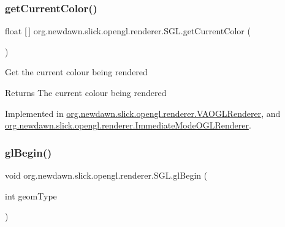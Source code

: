 \mbox{\label{interfaceorg_1_1newdawn_1_1slick_1_1opengl_1_1renderer_1_1_s_g_l_a212dd49f0deb91e38d917b5702704863}} 
\subsubsection{\texorpdfstring{get\+Current\+Color()}{getCurrentColor()}}
{\footnotesize\ttfamily float \mbox{[}$\,$\mbox{]} org.\+newdawn.\+slick.\+opengl.\+renderer.\+S\+G\+L.\+get\+Current\+Color (\begin{DoxyParamCaption}{ }\end{DoxyParamCaption})}

Get the current colour being rendered

\begin{DoxyReturn}{Returns}
The current colour being rendered 
\end{DoxyReturn}


Implemented in \mbox{\hyperlink{classorg_1_1newdawn_1_1slick_1_1opengl_1_1renderer_1_1_v_a_o_g_l_renderer_ab36435be5d5f256e10210a6a6b322727}{org.\+newdawn.\+slick.\+opengl.\+renderer.\+V\+A\+O\+G\+L\+Renderer}}, and \mbox{\hyperlink{classorg_1_1newdawn_1_1slick_1_1opengl_1_1renderer_1_1_immediate_mode_o_g_l_renderer_ad17f021212377ce528f3aa5fb6326e40}{org.\+newdawn.\+slick.\+opengl.\+renderer.\+Immediate\+Mode\+O\+G\+L\+Renderer}}.

\mbox{\label{interfaceorg_1_1newdawn_1_1slick_1_1opengl_1_1renderer_1_1_s_g_l_a34ef78aa5f8f5774c06117a01932fb02}} 
\subsubsection{\texorpdfstring{gl\+Begin()}{glBegin()}}
{\footnotesize\ttfamily void org.\+newdawn.\+slick.\+opengl.\+renderer.\+S\+G\+L.\+gl\+Begin (\begin{DoxyParamCaption}\item[{int}]{geom\+Type }\end{DoxyParamCaption})}

